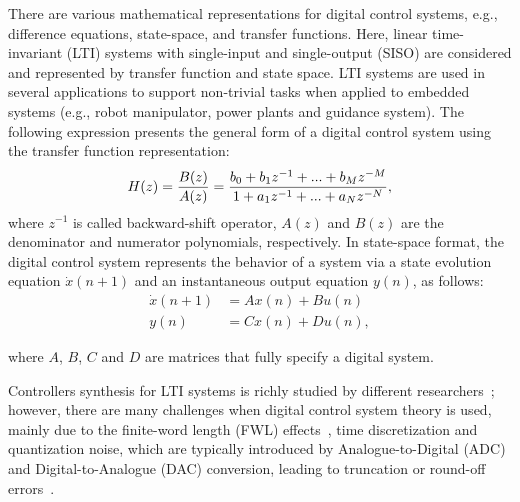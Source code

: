 \documentclass[10pt,conference]{IEEEtran}
\begin{document}


There are various mathematical representations for digital control
systems,  e.g.,  difference  equations,  state-space,  and
transfer functions. Here, linear time-invariant (LTI) systems 
with single-input and single-output (SISO) are considered and 
represented by transfer function and state space. LTI systems 
are used in several applications to support non-trivial tasks when 
applied to embedded systems (e.g., robot manipulator, power plants 
and guidance system). The following expression presents the general form 
of a digital control system using the transfer function representation:
%
\begin{equation}
\small
\label{eq:transferfunction}
H(z)=\frac{B(z)}{A(z)}=\frac{b_{0}+b_{1}z^{-1}+...+b_{M}z^{-M}}{1+a_{1}z^{-1}+...+a_{N}z^{-N}},
\end{equation}
%
\noindent where $z^{-1}$ is called backward-shift operator, $A(z)$ and $B(z)$ are 
the denominator and numerator polynomials, respectively.
%
In state-space format, the digital control system represents the behavior 
of a system via a state evolution equation $\dot{x}(n+1)$ and an instantaneous 
output equation $y(n)$, as follows:
%
\begin{equation}
\begin{split}
\dot{x}(n+1) &= A x(n) + B u(n)
\\
y(n) &= C x(n) + D u(n), 
\end{split}\label{eq:ss-example}
\end{equation}

\noindent where $A$, $B$, $C$ and $D$ are matrices that fully specify a digital system. 

Controllers synthesis for LTI systems is richly studied 
by different researchers~\cite{mazo2010pessoa,DBLP:conf/emsoft/RavanbakhshS16,economakos2016automated}; 
however, there are many challenges when 
digital control system theory is used, mainly due to the finite-word 
length (FWL) effects~\cite{Guang2013, Istepanian2001}, time discretization 
and quantization noise, which are typically introduced by Analogue-to-Digital 
(ADC) and Digital-to-Analogue (DAC) conversion, leading to truncation 
or round-off errors~\cite{astrom1997computer}. 
\end{document}
